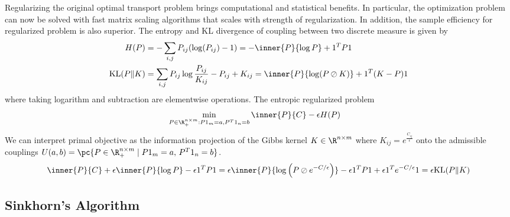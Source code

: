 \documentclass[11pt]{article}
\begin{document}
Regularizing the original optimal transport problem brings computational and statistical benefits. In particular, the optimization problem can now be solved with fast matrix scaling algorithms that scales with strength of regularization. In addition, the sample efficiency for regularized problem is also superior. The entropy and KL divergence of coupling between two discrete measure is given by
\begin{align}
    H(P)
        &= -\sum_{i,j} P_{ij}(\log(P_{ij})-1)
        = - \inner{P}{\log P} + 1^TP1 \\
    \text{KL}(P\Vert K)
        &= \sum_{i,j} P_{ij} \log \frac{P_{ij}}{K_{ij}} - P_{ij} + K_{ij}
        = \inner{P}{\log(P\oslash K)} + 1^T(K-P)1
\end{align}
where taking logarithm and subtraction are elementwise operations. The entropic regularized problem
\begin{align}
    \min_{P\in\R^{n\times m}_+:P1_m=a,P^T1_n=b}\,
        &\inner{P}{C} - \epsilon H(P)
    \label{eq:opt_entropic_regularized_ot}
\end{align}
We can interpret primal objective as the information projection of the Gibbs kernel $K\in\R^{n\times m}$ where $K_{ij}=e^{\frac{C_{ij}}{\epsilon}}$ onto the admissible couplings $U(a,b)=\pc{P\in\R^{n\times m}_+\mid P1_m=a,\, P^T1_n=b}$.
\begin{align}
    \inner{P}{C} + \epsilon\inner{P}{\log P} - \epsilon 1^T P 1
        = \epsilon \inner{P}{\log\left(P \oslash e^{-C/\epsilon} \right)} - \epsilon 1^TP1 + \epsilon 1^Te^{-C/\epsilon}1
        = \epsilon \text{KL}(P\Vert K)
\end{align}

\subsection{Sinkhorn's Algorithm}
\end{document}
